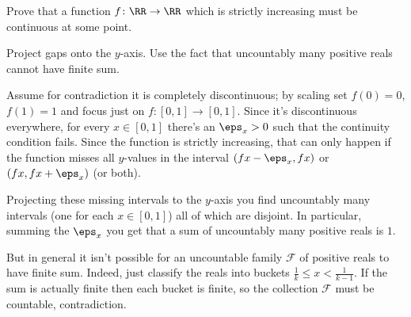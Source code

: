 \begin{problem}
	\yod
	Prove that a function $f \colon \RR \to \RR$ which is strictly increasing
	must be continuous at some point.
	\begin{hint}
		Project gaps onto the $y$-axis.
		Use the fact that uncountably many positive reals cannot have finite sum.
	\end{hint}
	\begin{sol}
		Assume for contradiction it is completely discontinuous;
		by scaling set $f(0) = 0$, $f(1) = 1$ and focus just on $f : [0,1] \to [0,1]$.
		Since it's discontinuous everywhere,
		for every $x \in [0,1]$ there's an $\eps_x > 0$
		such that the continuity condition fails.
		Since the function is strictly increasing,
		that can only happen if the
		function misses all $y$-values in the interval
		$(fx-\eps_x, fx)$ or $(fx, fx+\eps_x)$ (or both).

		Projecting these missing intervals to the $y$-axis you find uncountably
		many intervals (one for each $x \in [0,1]$) all of which are disjoint.
		In particular, summing the $\eps_x$ you get that a sum of uncountably
		many positive reals is $1$.

		But in general it isn't possible for an uncountable family $\mathcal F$
		of positive reals to have finite sum.
		Indeed, just classify the reals into buckets $\frac1k \le x < \frac1{k-1}$.
		If the sum is actually finite then each bucket is finite,
		so the collection $\mathcal F$ must be countable, contradiction.
	\end{sol}
\end{problem}
